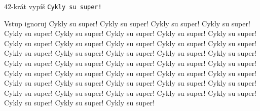 




$42$-krát vypíš \texttt{Cykly su super!}

\vstup
Vstup ignoruj
\vystup
Cykly su super!
Cykly su super!
Cykly su super!
Cykly su super!
Cykly su super!
Cykly su super!
Cykly su super!
Cykly su super!
Cykly su super!
Cykly su super!
Cykly su super!
Cykly su super!
Cykly su super!
Cykly su super!
Cykly su super!
Cykly su super!
Cykly su super!
Cykly su super!
Cykly su super!
Cykly su super!
Cykly su super!
Cykly su super!
Cykly su super!
Cykly su super!
Cykly su super!
Cykly su super!
Cykly su super!
Cykly su super!
Cykly su super!
Cykly su super!
Cykly su super!
Cykly su super!
Cykly su super!
Cykly su super!
Cykly su super!
Cykly su super!
Cykly su super!
Cykly su super!
Cykly su super!
Cykly su super!
Cykly su super!
Cykly su super!
\koniec


